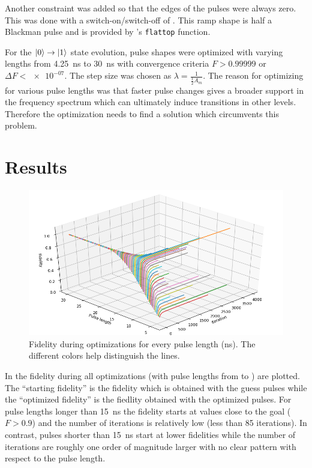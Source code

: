 \documentclass[main.tex]{subfiles}
\begin{document}
Another constraint was added so that the edges of the pulses were always zero.
This was done with a switch-on/switch-off of .
This ramp shape is half a Blackman pulse and is provided by \krotov{}'s \texttt{flattop} function.

For the \(\ket{0}\rightarrow\ket{1}\) state evolution, pulse shapes were optimized with varying lengths from \SI{4.25}{\nano\second} to \SI{30}{\nano\second} with convergence criteria \(F>0.99999\) or \(\Delta F < \num{e-07}\).
The step size was chosen as \(\lambda = \frac{1}{\frac{1}{2}A_{m}}\).
The reason for optimizing for various pulse lengths was that faster pulse changes gives a broader support in the frequency spectrum which can ultimately induce transitions in other levels.
Therefore the optimization needs to find a solution which circumvents this problem.

\section{Results}
\begin{figure}[H]
    \centering
    \includegraphics[width=\linewidth]{figs/3d-optim-ge.png}
    \caption{Fidelity during optimizations for every pulse length (ns). The different colors help distinguish the lines.}\label{fig:3d-optim-ge}
\end{figure}

In  the fidelity during all optimizations (with pulse lengths from  to ) are plotted.
The ``starting fidelity'' is the fidelity which is obtained with the guess pulses while the ``optimized fidelity'' is the fiedlity obtained with the optimized pulses.
For pulse lengths longer than \SI{15}{\nano\second} the fidelity starts at values close to the goal (\(F>0.9\)) and the number of iterations is relatively low (less than 85 iterations).
In contrast, pulses shorter than \SI{15}{\nano\second} start at lower fidelities while the number of iterations are roughly one order of magnitude larger with no clear pattern with respect to the pulse length.
\end{document}
